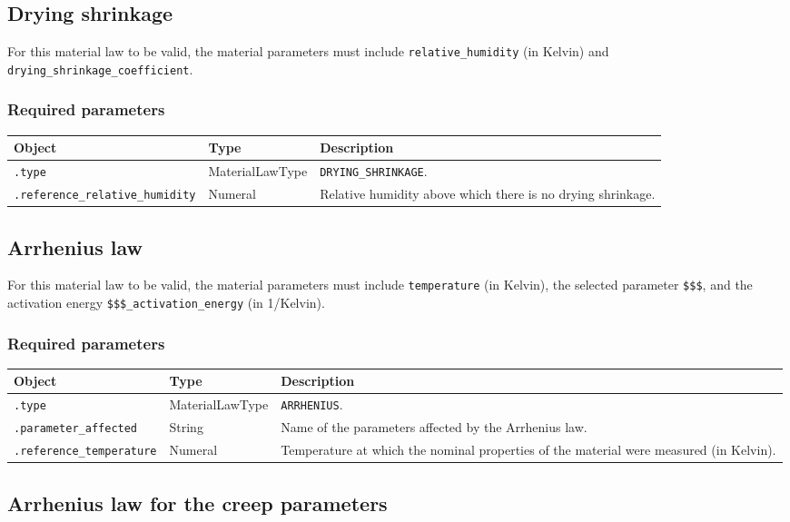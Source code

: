 \documentclass[10pt]{article}
\begin{document}
\subsection{Drying shrinkage}

For this material law to be valid, the material parameters must include \verb+relative_humidity+ (in Kelvin) and \verb+drying_shrinkage_coefficient+.

\subsubsection*{Required parameters}

\begin{tabularx}{\textwidth}{llX}
\hline 
Object & Type & Description \\ 
\hline 
\verb+.type+ & MaterialLawType & \verb+DRYING_SHRINKAGE+. \\ 
\verb+.reference_relative_humidity+ & Numeral & Relative humidity above which there is no drying shrinkage. \\ 
\hline 
\end{tabularx}

\subsection{Arrhenius law}

For this material law to be valid, the material parameters must include \verb+temperature+ (in Kelvin), the selected parameter \verb+$$$+, and the activation energy \verb+$$$_activation_energy+ (in 1/Kelvin).

\subsubsection*{Required parameters}

\begin{tabularx}{\textwidth}{llX}
\hline 
Object & Type & Description \\ 
\hline 
\verb+.type+ & MaterialLawType & \verb+ARRHENIUS+. \\ 
\verb+.parameter_affected+ & String & Name of the parameters affected by the Arrhenius law. \\
\verb+.reference_temperature+ & Numeral & Temperature at which the nominal properties of the material were measured (in Kelvin). \\ 
\hline 
\end{tabularx}

\subsection{Arrhenius law for the creep parameters}
\end{document}
